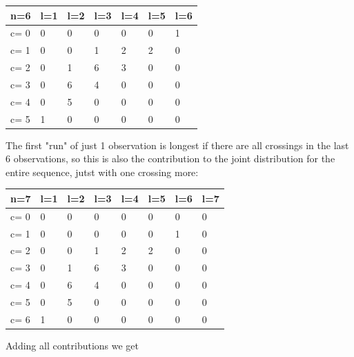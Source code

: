 \begin{tabular}{l | l l l l l l}
\hline
n=6&l=1&l=2&l=3&l=4&l=5&l=6\\
\hline
c= 0& 0& 0& 0& 0& 0& 1\\
c= 1& 0& 0& 1& 2& 2& 0\\
c= 2& 0& 1& 6& 3& 0& 0\\
c= 3& 0& 6& 4& 0& 0& 0\\
c= 4& 0& 5& 0& 0& 0& 0\\
c= 5& 1& 0& 0& 0& 0& 0\\
\hline
\end{tabular}

The first "run" of just 1 observation is longest if there are all crossings in the last 6 observations, so this is also the contribution to the joint distribution for the entire sequence, jutst with one crossing more: 

\begin{tabular}{l | l l l l l l l}
\hline
n=7&l=1&l=2&l=3&l=4&l=5&l=6&l=7\\
\hline
c= 0& 0& 0& 0& 0& 0& 0& 0\\
c= 1& 0& 0& 0& 0& 0& 1& 0\\
c= 2& 0& 0& 1& 2& 2& 0& 0\\
c= 3& 0& 1& 6& 3& 0& 0& 0\\
c= 4& 0& 6& 4& 0& 0& 0& 0\\
c= 5& 0& 5& 0& 0& 0& 0& 0\\
c= 6& 1& 0& 0& 0& 0& 0& 0\\
\hline
\end{tabular}

Adding all contributions we get


